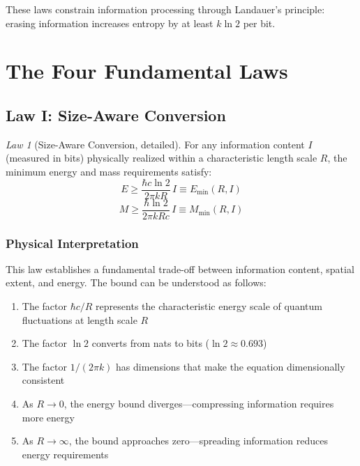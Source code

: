 \documentclass[11pt,a4paper]{article}
\theoremstyle{plain}
\theoremstyle{definition}
\theoremstyle{remark}
\newtheorem{law}{Law}
\begin{document}
These laws constrain information processing through Landauer's principle: erasing information increases entropy by at least $k\ln 2$ per bit.

\section{The Four Fundamental Laws}
\label{sec:laws}

\subsection{Law I: Size-Aware Conversion}

\begin{law}[Size-Aware Conversion, detailed]
For any information content $I$ (measured in bits) physically realized within a characteristic length scale $R$, the minimum energy and mass requirements satisfy:
\begin{equation}
E \geq \frac{\hbar c\ln 2}{2\pi k R}\,I \equiv E_{\min}(R,I)
\label{eq:law1_detailed}
\end{equation}
\begin{equation}
M \geq \frac{\hbar\ln 2}{2\pi k R c}\,I \equiv M_{\min}(R,I)
\label{eq:mass_bound}
\end{equation}
\end{law}

\subsubsection{Physical Interpretation}

This law establishes a fundamental trade-off between information content, spatial extent, and energy. The bound can be understood as follows:

\begin{enumerate}[leftmargin=*]
\item The factor $\hbar c/R$ represents the characteristic energy scale of quantum fluctuations at length scale $R$
\item The factor $\ln 2$ converts from nats to bits ($\ln 2 \approx 0.693$)
\item The factor $1/(2\pi k)$ has dimensions that make the equation dimensionally consistent
\item As $R\to 0$, the energy bound diverges—compressing information requires more energy
\item As $R\to\infty$, the bound approaches zero—spreading information reduces energy requirements
\end{enumerate}
\end{document}
